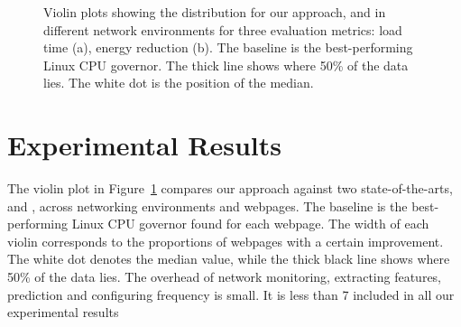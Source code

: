 \begin{figure}[t]
	\centering
    \hfill
    \hfill

    \caption{Violin plots showing the distribution for our approach, \SML and \WS in different network environments for three evaluation metrics: load time (a), energy reduction (b). The baseline is the best-performing Linux CPU governor. The thick line shows
where 50\% of the data lies. The white dot is the position of the median.}
    \label{fig:cpother}
    \vspace{-3mm}
\end{figure}


\section{Experimental Results\label{sec:experimental}}

The violin plot in Figure~\ref{fig:cpother} compares our approach against two state-of-the-arts, \SML and \WS, across networking
environments and webpages. The baseline is the best-performing Linux CPU governor found for each webpage. The width of each violin
corresponds to the proportions of webpages with a certain improvement. The white dot denotes the median value, while the thick black line
shows where 50\% of the data lies.
The overhead of network monitoring,
extracting features, prediction and configuring frequency is
small. It is less than 7%
included in all our experimental results

